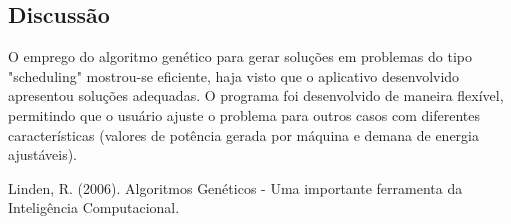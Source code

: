 \documentclass[twoside]{article}
\begin{document}
\begin{multicols}{2}
\section{Discussão}
O emprego do algoritmo genético para gerar soluções em problemas do tipo "scheduling" mostrou-se eficiente, haja visto que o aplicativo desenvolvido apresentou soluções adequadas. O programa foi desenvolvido de maneira flexível, permitindo que o usuário ajuste o problema para outros casos com diferentes características (valores de potência gerada por máquina e demana de energia ajustáveis).


\begin{thebibliography}{99} %

Linden, R. (2006).
\newblock Algoritmos Genéticos - Uma importante ferramenta da Inteligência Computacional.
 
\end{thebibliography}


\end{multicols}
\end{document}
